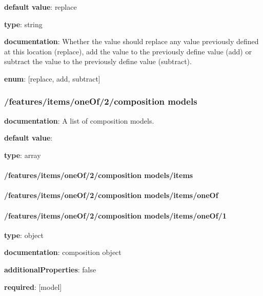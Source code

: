\begin{itemized}
\item {\bf default value}: replace
\item {\bf type}: string
\item {\bf documentation}: Whether the value should replace any value previously defined at this location (replace), add the value to the previously define value (add) or subtract the value to the previously define value (subtract).
\item {\bf enum}: [replace, add, subtract]\end{itemized}\subsubsection{/features/items/oneOf/2/composition models} \begin{itemized}
\item {\bf documentation}: A list of composition models.
\item {\bf default value}: 
\item {\bf type}: array
\paragraph{/features/items/oneOf/2/composition models/items} \begin{itemized}
\end{itemized}\end{itemized}\paragraph{/features/items/oneOf/2/composition models/items/oneOf} \begin{itemized}
\end{itemized}\paragraph{/features/items/oneOf/2/composition models/items/oneOf/1} \begin{itemized}
\item {\bf type}: object
\item {\bf documentation}: composition object
\item {\bf additionalProperties}: false
\item {\bf required}: [model]\end{itemized}
